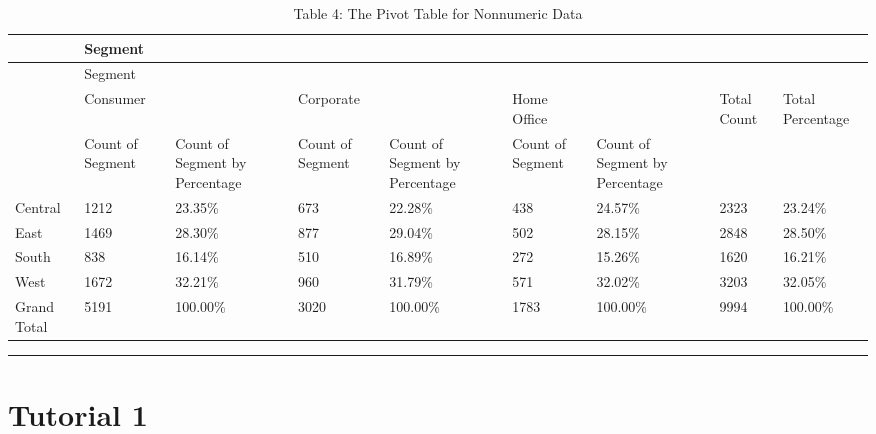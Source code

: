 \documentclass[
]{article}
\theoremstyle{definition}
\theoremstyle{definition}
\theoremstyle{definition}
\theoremstyle{definition}
\theoremstyle{remark}
\begin{document}
\begin{longtable}[]{@{}lllllllll@{}}
\caption{Table 4: The Pivot Table for Nonnumeric Data}\tabularnewline
\toprule
& Segment & & & & & & & \\
\midrule
\endfirsthead
\toprule
& Segment & & & & & & & \\
\midrule
\endhead
& Consumer & & Corporate & & Home Office & & Total Count & Total Percentage \\
& Count of Segment & Count of Segment by Percentage & Count of Segment & Count of Segment by Percentage & Count of Segment & Count of Segment by Percentage & & \\
Central & 1212 & 23.35\% & 673 & 22.28\% & 438 & 24.57\% & 2323 & 23.24\% \\
East & 1469 & 28.30\% & 877 & 29.04\% & 502 & 28.15\% & 2848 & 28.50\% \\
South & 838 & 16.14\% & 510 & 16.89\% & 272 & 15.26\% & 1620 & 16.21\% \\
West & 1672 & 32.21\% & 960 & 31.79\% & 571 & 32.02\% & 3203 & 32.05\% \\
Grand Total & 5191 & 100.00\% & 3020 & 100.00\% & 1783 & 100.00\% & 9994 & 100.00\% \\
\bottomrule
\end{longtable}

\begin{center}\rule{0.5\linewidth}{0.5pt}\end{center}

\hypertarget{tutorial-1}{%
\section{Tutorial 1}\label{tutorial-1}}
\end{document}
